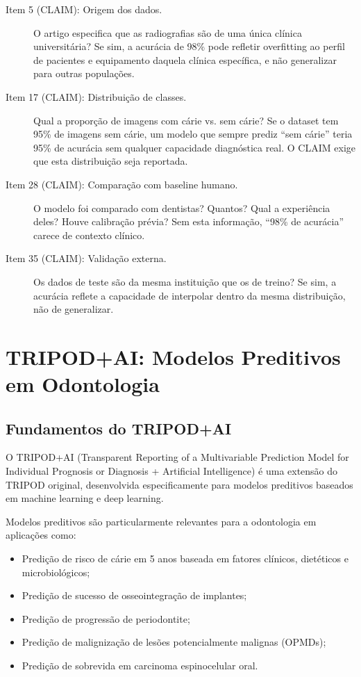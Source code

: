 \begin{description}
    \item[Item 5 (CLAIM): Origem dos dados.] O artigo especifica que as radiografias são de uma única clínica universitária? Se sim, a acurácia de 98\% pode refletir overfitting ao perfil de pacientes e equipamento daquela clínica específica, e não generalizar para outras populações.
    \item[Item 17 (CLAIM): Distribuição de classes.] Qual a proporção de imagens com cárie vs. sem cárie? Se o dataset tem 95\% de imagens sem cárie, um modelo que sempre prediz ``sem cárie'' teria 95\% de acurácia sem qualquer capacidade diagnóstica real. O CLAIM exige que esta distribuição seja reportada.
    \item[Item 28 (CLAIM): Comparação com baseline humano.] O modelo foi comparado com dentistas? Quantos? Qual a experiência deles? Houve calibração prévia? Sem esta informação, ``98\% de acurácia'' carece de contexto clínico.
    \item[Item 35 (CLAIM): Validação externa.] Os dados de teste são da mesma instituição que os de treino? Se sim, a acurácia reflete a capacidade de interpolar dentro da mesma distribuição, não de generalizar.
\end{description}

\section{TRIPOD+AI: Modelos Preditivos em Odontologia}

\subsection{Fundamentos do TRIPOD+AI}

O TRIPOD+AI  (Transparent Reporting of a Multivariable Prediction Model for Individual Prognosis or Diagnosis + Artificial Intelligence) é uma extensão do TRIPOD original, desenvolvida especificamente para modelos preditivos baseados em machine learning e deep learning.

Modelos preditivos são particularmente relevantes para a odontologia em aplicações como:
\begin{itemize}
    \item Predição de risco de cárie em 5 anos baseada em fatores clínicos, dietéticos e microbiológicos;
    \item Predição de sucesso de osseointegração de implantes;
    \item Predição de progressão de periodontite;
    \item Predição de malignização de lesões potencialmente malignas (OPMDs);
    \item Predição de sobrevida em carcinoma espinocelular oral.
\end{itemize}

